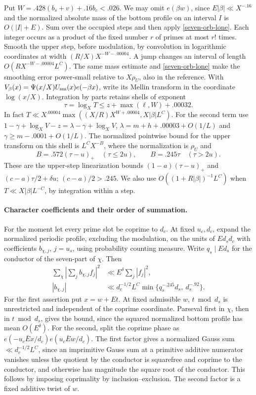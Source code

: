 \documentclass[11pt,a4paper]{article}
\theoremstyle{paperplain}
\numberwithin{equation}{section}
\begin{document}
Put \(W=.428(b_s+v)+.16b_c<.026\).
We may omit \(e(\beta w)\), since \(E|\beta|\ll X^{-.16}\) and the
normalized absolute mass of the bottom profile on an interval \(I\)
is \(O(|I|+E)\). Sum over the occupied steps and then apply
\eqref{seven-orb-lone}. Each integer occurs as a product of the fixed
number \(r\) of primes at most \(r!\) times.
Smooth the upper step, before modulation, by convolution in logarithmic
coordinates at width \((R/X)X^{-W-.00004}\). A jump changes an
interval of length \(O(RX^{-W-.00004}L^C)\). The same mass estimate
and \eqref{seven-orb-lone} make the smoothing error power-small
relative to \(X\rho_U\), also in the reference. With
\(V_\beta(x)=\Psi(x/X)U_{\rm sm}(x)e(-\beta x)\), write its Mellin
transform in the coordinate \(\log(x/X)\). Integration by parts
retains shells of exponent
\[
 \tau=\log_XT \le z+\max(\ell,W)+.00032 .
\]
In fact \(T\ll X^{.00004}\max((X/R)X^{W+.00004},X|\beta|L^C)\).
For the second term use \(1-\gamma+\log_XV-z=\lambda-\gamma+\log_XV\),
\(\lambda=m+h+.00003+O(1/L)\) and \(\gamma\ge m-.0001+O(1/L)\).
The normalized pointwise bound for the upper transform on this shell is
\(L^CX^{-B}\), where the normalization is \(\rho_U\) and
\[
 B=.572(\tau-u)_+\quad(\tau\le2u),\qquad
 B=.245\tau\quad(\tau>2u).
\]
These are the upper-step linearization bounds
\((1-a)(\tau-u)_+\) and \((c-a)\tau/2+\delta u\);
\((c-a)/2>.245\).
We also use \(O((1+R|\beta|)^{-1}L^C)\) when
\(T\ll X|\beta|L^{-C}\), by integration within a step.

\paragraph{Character coefficients and their order of summation.}
For the moment let every prime slot be coprime to \(d_c\).
At fixed \(u_c,d_c\), expand the normalized periodic profile, excluding
the modulation, on the units of \(Ed_sd_c\) with coefficients
\(b_{\chi,j}\), \(j=u_s\), using probability counting measure.
Write \(q_s\mid Ed_s\) for the conductor of the seven-part of \(\chi\).
Then
\begin{align}
 \sum_\chi\left|\sum_j b_{\chi,j}f_j\right|^2
    &\ll E^\delta\sum_j|f_j|^2,\label{seven-orb-unitary}\\
 |b_{\chi,j}|&\ll d_c^{-1/2}L^C
       \min\{q_s^{-.245}d_s,\ d_s^{-.92}\}.\label{seven-orb-point}
\end{align}
For the first assertion put \(x=w+Et\). At fixed admissible \(w\),
\(t\bmod d_s\) is unrestricted and independent of the coprime
coordinate. Parseval first in \(\chi\), then in \(t\bmod d_s\),
gives the bound, since the squared normalized bottom profile has
mean \(O(E^\delta)\). For the second, split the coprime phase as
\(e(-u_c\bar E x/d_c)e(u_c\bar E w/d_c)\).
The first factor gives a normalized Gauss sum
\(\ll d_c^{-1/2}L^C\), since an imprimitive Gauss sum at a primitive
additive numerator vanishes unless the quotient by the conductor is
squarefree and coprime to the conductor, and otherwise has magnitude
the square root of the conductor. This follows by imposing
coprimality by inclusion--exclusion. The second factor is a fixed
additive twist of \(w\).
\end{document}
